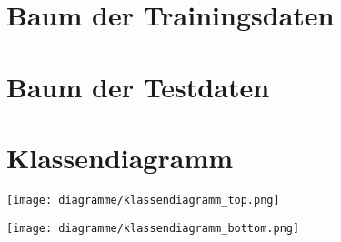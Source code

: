 \newpage
\appendix
\section{Baum der Trainingsdaten}\label{appendix:baum-training}


\newpage
\section{Baum der Testdaten}\label{appendix:baum-test}



\newpage
\section{Klassendiagramm}\label{appendix:klassendiagramm}
\texttt{[image: diagramme/klassendiagramm\_top.png]}

\texttt{[image: diagramme/klassendiagramm\_bottom.png]}